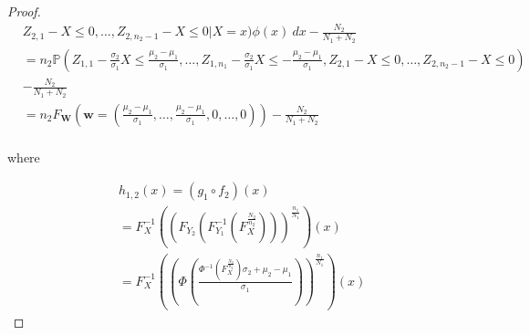\documentclass[12pt]{article}
\begin{document}
\begin{proof}
\begin{align*}
  &Z_{2,1} -X \leq 0, \dots,  Z_{2,{n_2-1}} -X \leq 0| X = x) \phi(x)\ dx - \frac{N_2}{N_1 + N_2}\\
  &= n_2\mathbb{P}(Z_{1,1} -\frac{\sigma_2}{\sigma_1}X \leq \frac{\mu_2 - \mu_1}{\sigma_1}, \dots, Z_{1,n_1} -\frac{\sigma_2}{\sigma_1}X \leq - \frac{\mu_2 - \mu_1}{\sigma_1}, Z_{2,1} -X \leq 0, \dots,  Z_{2,{n_2-1}} -X \leq 0) \\
  &- \frac{N_2}{N_1 + N_2}\\
  &= n_2F_{\mathbf{W}}(\mathbf{w} = (\frac{\mu_2 - \mu_1}{\sigma_1}, \dots, \frac{\mu_2 - \mu_1}{\sigma_1}, 0, \dots, 0)) - \frac{N_2}{N_1 + N_2} \\
\end{align*}
  
where

\begin{align*}
	&h_{1,2}(x) = (g_1 \circ f_2)(x) \\
	&= F_X^{-1}((F_{Y_2}(F_{Y_1}^{-1}(F_X^{\frac{N_2}{n_2}})))^{\frac{n_1}{N_1}})(x)\\
	&= F_X^{-1}((\Phi(\frac{\Phi^{-1}(F_X^{\frac{N_2}{n_2}})\sigma_2 + \mu_2 - \mu_1}{\sigma_1}))^{\frac{n_1}{N_1}})(x)
	\end{align*}
	

\end{proof}
\end{document}
